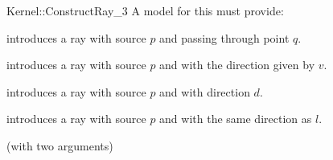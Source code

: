 \begin{ccRefFunctionObjectConcept}{Kernel::ConstructRay_3}
A model for this must provide:


            {introduces a ray  
             with source $p$ and passing through point $q$.}

            {introduces a ray with source $p$ and with 
             the direction given by $v$.}

            {introduces a ray with source $p$ and with 
             direction $d$.}

            {introduces a ray with source $p$ and with 
             the same direction as $l$.}

\ccRefines
{} (with two arguments)

\ccSeeAlso
{}\\

\end{ccRefFunctionObjectConcept}
